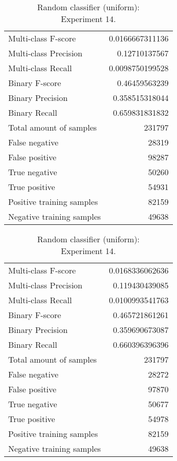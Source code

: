 \begin{table}[H]
\begin{minipage}{0.5\textwidth}
\caption{Random classifier (uniform): \\Experiment 13.}
\centering
\begin{tabular}{l r}
\toprule
Multi-class F-score & 0.0166667311136 \\
Multi-class Precision & 0.12710137567 \\
Multi-class Recall & 0.0098750199528 \\
\midrule
Binary F-score & 0.46459563239 \\
Binary Precision & 0.358515318044 \\
Binary Recall & 0.659831831832 \\
\midrule
Total amount of samples & 231797 \\
False negative & 28319 \\
False positive & 98287 \\
True negative & 50260 \\
True positive & 54931 \\
\midrule
Positive training samples & 82159 \\
Negative training samples & 49638 \\
\bottomrule
\end{tabular}
\end{minipage}
\hfillx
\begin{minipage}{0.5\textwidth}
\caption{Random classifier (uniform): \\Experiment 14.}
\centering
\begin{tabular}{l r}
\toprule
Multi-class F-score & 0.0168336062636 \\
Multi-class Precision & 0.119430439085 \\
Multi-class Recall & 0.0100993541763 \\
\midrule
Binary F-score & 0.465721861261 \\
Binary Precision & 0.359690673087 \\
Binary Recall & 0.660396396396 \\
\midrule
Total amount of samples & 231797 \\
False negative & 28272 \\
False positive & 97870 \\
True negative & 50677 \\
True positive & 54978 \\
\midrule
Positive training samples & 82159 \\
Negative training samples & 49638 \\
\bottomrule
\end{tabular}
\end{minipage}
\end{table}
